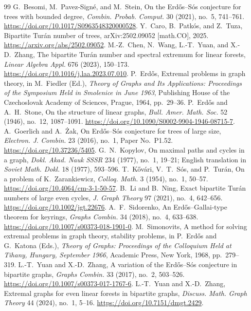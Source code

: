 \documentclass[10pt,a4paper]{amsart}
\begin{document}
\begin{thebibliography}{99}
 G.~Besomi, M.~Pavez-Sign\'e, and M.~Stein, On the Erd\H{o}s--S\'os conjecture for trees with bounded degree, \emph{Combin. Probab. Comput.} 30 (2021), no.~5, 741--761. \url{https://doi.org/10.1017/S0963548320000528}.
 Y.~Caro, B.~Patk\'os, and Z.~Tuza, Bipartite Tur\'an number of trees, arXiv:2502.09052 [math.CO], 2025. \url{https://arxiv.org/abs/2502.09052}.
 M.-Z.~Chen, N.~Wang, L.-T.~Yuan, and X.-D.~Zhang, The bipartite Tur\'an number and spectral extremum for linear forests, \emph{Linear Algebra Appl.} 676 (2023), 150--173. \url{https://doi.org/10.1016/j.laa.2023.07.010}.
 P.~Erd\H{o}s, Extremal problems in graph theory, in M.~Fiedler (Ed.), \emph{Theory of Graphs and Its Applications: Proceedings of the Symposium Held in Smolenice in June 1963}, Publishing House of the Czechoslovak Academy of Sciences, Prague, 1964, pp.~29--36.
 P.~Erd\H{o}s and A.~H.~Stone, On the structure of linear graphs, \emph{Bull. Amer. Math. Soc.} 52 (1946), no.~12, 1087--1091. \url{https://doi.org/10.1090/S0002-9904-1946-08715-7}.
 A.~Goerlich and A.~\.Zak, On Erd\H{o}s--S\'os conjecture for trees of large size, \emph{Electron. J. Combin.} 23 (2016), no.~1, Paper No.~P1.52. \url{https://doi.org/10.37236/5405}.
 G.~N.~Kopylov, On maximal paths and cycles in a graph, \emph{Dokl. Akad. Nauk SSSR} 234 (1977), no.~1, 19--21; English translation in \emph{Soviet Math. Dokl.} 18 (1977), 593--596.
 T.~K\H{o}v\'ari, V.~T.~S\'os, and P.~Tur\'an, On a problem of K.~Zarankiewicz, \emph{Colloq. Math.} 3 (1954), no.~1, 50--57. \url{https://doi.org/10.4064/cm-3-1-50-57}.
 B.~Li and B.~Ning, Exact bipartite Tur\'an numbers of large even cycles, \emph{J. Graph Theory} 97 (2021), no.~4, 642--656. \url{https://doi.org/10.1002/jgt.22676}.
 A.~F.~Sidorenko, An Erd\H{o}s--Gallai-type theorem for keyrings, \emph{Graphs Combin.} 34 (2018), no.~4, 633--638. \url{https://doi.org/10.1007/s00373-018-1901-0}.
 M.~Simonovits, A method for solving extremal problems in graph theory, stability problems, in P.~Erd\H{o}s and G.~Katona (Eds.), \emph{Theory of Graphs: Proceedings of the Colloquium Held at Tihany, Hungary, September 1966}, Academic Press, New York, 1968, pp.~279--319.
 L.-T.~Yuan and X.-D.~Zhang, A variation of the Erd\H{o}s--S\'os conjecture in bipartite graphs, \emph{Graphs Combin.} 33 (2017), no.~2, 503--526. \url{https://doi.org/10.1007/s00373-017-1767-6}.
 L.-T.~Yuan and X.-D.~Zhang, Extremal graphs for even linear forests in bipartite graphs, \emph{Discuss. Math. Graph Theory} 44 (2024), no.~1, 5--16. \url{https://doi.org/10.7151/dmgt.2429}.
\end{thebibliography}
\end{document}
